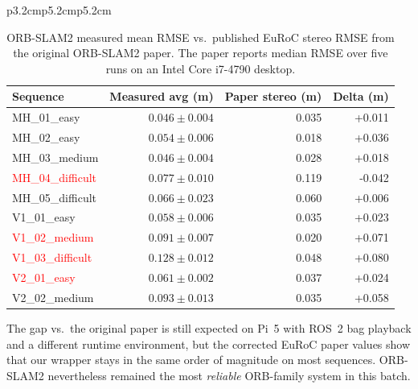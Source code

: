 \documentclass[11pt]{article}
\begin{document}
\begin{table}[ht]
\begin{tabular}{p{3.2cm}p{5.2cm}p{5.2cm}}
\begin{table}[H]
\centering
\small
\caption{ORB-SLAM2 measured mean RMSE vs.\ published EuRoC stereo RMSE from the original ORB-SLAM2 paper. The paper reports median RMSE over five runs on an Intel Core i7-4790 desktop.}
\label{tab:orbslam2_vs_paper}
\begin{tabular}{lrrr}
\toprule
Sequence & Measured avg (m) & Paper stereo (m) & Delta (m) \\
\midrule
MH\_01\_easy       & $0.046 \pm 0.004$ & 0.035 & +0.011 \\
MH\_02\_easy       & $0.054 \pm 0.006$ & 0.018 & +0.036 \\
MH\_03\_medium     & $0.046 \pm 0.004$ & 0.028 & +0.018 \\
\textcolor{red}{MH\_04\_difficult} & $0.077 \pm 0.010$ & 0.119 & -0.042 \\
MH\_05\_difficult  & $0.066 \pm 0.023$ & 0.060 & +0.006 \\
V1\_01\_easy       & $0.058 \pm 0.006$ & 0.035 & +0.023 \\
\textcolor{red}{V1\_02\_medium}   & $0.091 \pm 0.007$ & 0.020 & +0.071 \\
\textcolor{red}{V1\_03\_difficult}& $0.128 \pm 0.012$ & 0.048 & +0.080 \\
\textcolor{red}{V2\_01\_easy}     & $0.061 \pm 0.002$ & 0.037 & +0.024 \\
V2\_02\_medium     & $0.093 \pm 0.013$ & 0.035 & +0.058 \\
\bottomrule
\end{tabular}
\end{table}

The gap vs.\ the original paper is still expected on Pi~5 with ROS~2 bag playback and a different runtime environment, but the corrected EuRoC paper values show that our wrapper stays in the same order of magnitude on most sequences. ORB-SLAM2 nevertheless remained the most \emph{reliable} ORB-family system in this batch.


\end{tabular}
\end{table}
\end{document}
